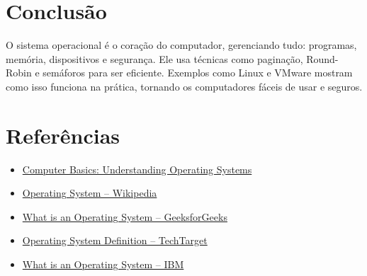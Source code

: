 \documentclass[a4paper,12pt]{article}
\begin{document}
\section*{Conclusão}

O sistema operacional é o coração do computador, gerenciando tudo: programas, memória, dispositivos e segurança. Ele usa técnicas como paginação, Round-Robin e semáforos para ser eficiente. Exemplos como Linux e VMware mostram como isso funciona na prática, tornando os computadores fáceis de usar e seguros.

\section*{Referências}

\begin{itemize}
    \item \href{https://edu.gcfglobal.org/en/computerbasics/understanding-operating-systems/1/}{Computer Basics: Understanding Operating Systems}
    \item \href{https://en.wikipedia.org/wiki/Operating_system}{Operating System -- Wikipedia}
    \item \href{https://www.geeksforgeeks.org/what-is-an-operating-system/}{What is an Operating System -- GeeksforGeeks}
    \item \href{https://www.techtarget.com/whatis/definition/operating-system-OS}{Operating System Definition -- TechTarget}
    \item \href{https://www.ibm.com/think/topics/operating-systems}{What is an Operating System -- IBM}
\end{itemize}
\end{document}

